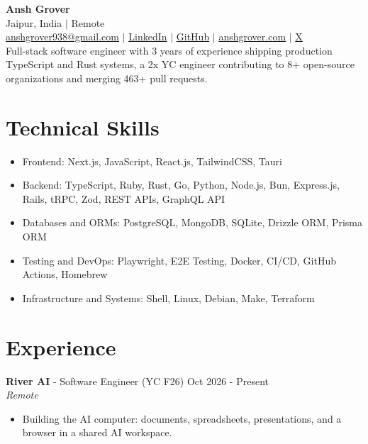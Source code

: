 \documentclass[letterpaper,10pt]{article}
\begin{document}

\begin{center}
{\Huge\textbf{Ansh Grover}} \\[2pt]
Jaipur, India $|$ Remote \\[1pt]
\href{mailto:anshgrover938@gmail.com}{anshgrover938@gmail.com} $|$
\href{https://www.linkedin.com/in/anshgrover23}{LinkedIn} $|$
\href{https://github.com/Anshgrover23}{GitHub} $|$
\href{https://anshgrover.com}{anshgrover.com} $|$
\href{https://x.com/Anshgrover23}{X}
\\[6pt]
\small Full-stack software engineer with 3 years of experience shipping production TypeScript and Rust systems, a 2x YC engineer contributing to 8+ open-source organizations and merging 463+ pull requests.
\end{center}

\vspace{-6pt}


\section{Technical Skills}
\begin{itemize}
    \item Frontend: Next.js, JavaScript, React.js, TailwindCSS, Tauri
    \item Backend: TypeScript, Ruby, Rust, Go, Python, Node.js, Bun, Express.js, Rails, tRPC, Zod, REST APIs, GraphQL API
    \item Databases and ORMs: PostgreSQL, MongoDB, SQLite, Drizzle ORM, Prisma ORM
    \item Testing and DevOps: Playwright, E2E Testing, Docker, CI/CD, GitHub Actions, Homebrew
    \item Infrastructure and Systems: Shell, Linux, Debian, Make, Terraform
\end{itemize}


\section{Experience}

{\bfseries River AI} - Software Engineer (YC F26) \hfill Oct 2026 - Present \\
\textit{Remote}
\begin{itemize}
    \item Building the AI computer: documents, spreadsheets, presentations, and a browser in a shared AI workspace.
\end{itemize}
\end{document}
